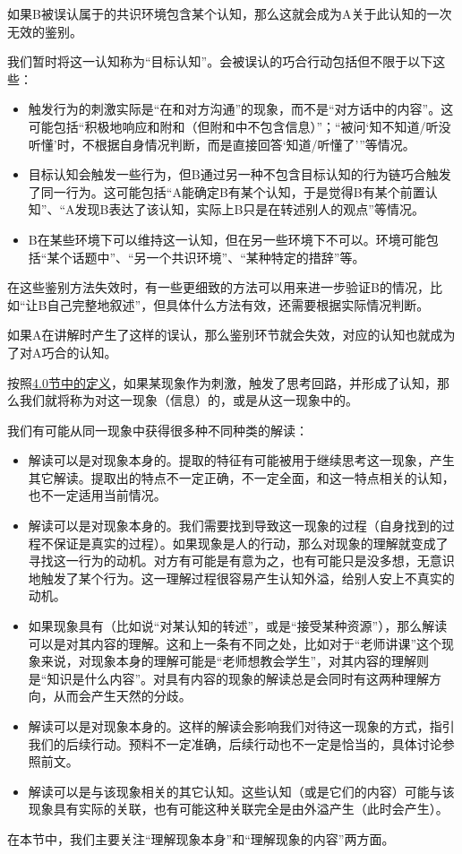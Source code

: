如果B被误认属于的共识环境包含某个认知，那么这就会成为A关于此认知的一次无效的鉴别。
\begin{explain}
我们暂时将这一认知称为“目标认知”。会被误认的巧合行动包括但不限于以下这些：
\begin{itemize}
\item 触发行为的刺激实际是“在和对方沟通”的现象，而不是“对方话中的内容”。这可能包括“积极地响应和附和（但附和中不包含信息）”；“被问‘知不知道/听没听懂’时，不根据自身情况判断，而是直接回答‘知道/听懂了’”等情况。
\item 目标认知会触发一些行为，但B通过另一种不包含目标认知的行为链巧合触发了同一行为。这可能包括“A能确定B有某个认知，于是觉得B有某个前置认知”、“A发现B表达了该认知，实际上B只是在转述别人的观点”等情况。
\item B在某些环境下可以维持这一认知，但在另一些环境下不可以。环境可能包括“某个话题中”、“另一个共识环境”、“某种特定的措辞”等。
\end{itemize}
在这些鉴别方法失效时，有一些更细致的方法可以用来进一步验证B的情况，比如“让B自己完整地叙述”，但具体什么方法有效，还需要根据实际情况判断。

如果A在讲解时产生了这样的误认，那么鉴别环节就会失效，对应的认知也就成为了对A巧合的认知。
\end{explain}

按照\hyperref[def:解读]{4.0节中的定义}，如果某现象作为刺激，触发了思考回路，并形成了认知，那么我们就将称为对这一现象（信息）的，或是从这一现象中的。
\begin{explain}
我们有可能从同一现象中获得很多种不同种类的解读：
\begin{itemize}
\item 解读可以是对现象本身的。提取的特征有可能被用于继续思考这一现象，产生其它解读。提取出的特点不一定正确，不一定全面，和这一特点相关的认知，也不一定适用当前情况。
\item 解读可以是对现象本身的。我们需要找到导致这一现象的过程（自身找到的过程不保证是真实的过程）。如果现象是人的行动，那么对现象的理解就变成了寻找这一行为的动机。对方有可能是有意为之，也有可能只是没多想，无意识地触发了某个行为。这一理解过程很容易产生认知外溢，给别人安上不真实的动机。
\item 如果现象具有（比如说“对某认知的转述”，或是“接受某种资源”），那么解读可以是对其内容的理解。这和上一条有不同之处，比如对于“老师讲课”这个现象来说，对现象本身的理解可能是“老师想教会学生”，对其内容的理解则是“知识是什么内容”。对具有内容的现象的解读总是会同时有这两种理解方向，从而会产生天然的分歧。
\item 解读可以是对现象本身的。这样的解读会影响我们对待这一现象的方式，指引我们的后续行动。预料不一定准确，后续行动也不一定是恰当的，具体讨论参照前文。
\item 解读可以是与该现象相关的其它认知。这些认知（或是它们的内容）可能与该现象具有实际的关联，也有可能这种关联完全是由外溢产生（此时会产生）。
\end{itemize}
在本节中，我们主要关注“理解现象本身”和“理解现象的内容”两方面。
\end{explain}

